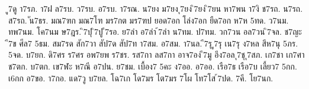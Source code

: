 {ู7ดู
า7รภ.
า7ฝ
ล7รบ.
ว7รบ.
อ7รบ.
า7รณ.
น7ยง
ม7ยง
ุ7ยง
ิ7ยง
ิ7ยน
หา7พน
า7งิ
ช7รถ.
น7รถ.
ส7รถ.
ัน7ธร.
มณ7ฑก
มณ7โฑ
มร7กต
มร7ฑป
ยอด7อก
โล่ง7อก
ยืด7อก
ห7ห
5ทด.
ว7นม.
ทพ7นม.
โค7นม
ษ7ฎร.
ิ7ปุ
ิ7ปู
ี7รอ.
ย7ลำ
อ7ลำ
้7ลำ
น7ทม.
ป7ทม.
วก7วน
อล7วน
ิ7จล.
ช7ญะ
ี7ข
ศีล7
5ธม.
สม7รด
สัก7วา
สัป7ด
สัป7ท
า7สม.
อ7สม.
า7นล.
ี7รุ
ู7รุ
เน7รุ
ง7หล
สีห7นุ
5ภร.
5จด.
บ7ยก.
ดิ7ศร
ร7ศร
อพ7ยพ
ร7ชร.
รส7กา
ลส7กา
อาจ7อง
ี7มู
อึง7อล
ุ7ชุ
ุ7สภ.
เก7ชา
เก7ศา
ช7ตก.
บ7ตก.
เข7ฬะ
ห7ณี
อ7ปน.
ย7ชม.
เบื้อง7
5คะ
ง7ออ.
อ7ออ.
เรือ7ธ
เรือ7บ
เลี้ยว7
5กก.
เ6กก
อ7ขอ.
า7กอ.
แด7วู
บ7ยล.
โฉ7เก
โด7มร
โต7มร
7โผ
โท7โส
้7ปด.
7คี.
โย7นก.
}
